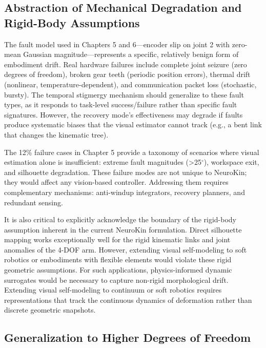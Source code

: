 \documentclass[12pt,a4paper,oneside]{report}
\begin{document}
\subsection{Abstraction of Mechanical Degradation and Rigid-Body Assumptions}

The fault model used in Chapters 5 and 6---encoder slip on joint 2 with zero-mean Gaussian magnitude---represents a specific, relatively benign form of embodiment drift. Real hardware failures include complete joint seizure (zero degrees of freedom), broken gear teeth (periodic position errors), thermal drift (nonlinear, temperature-dependent), and communication packet loss (stochastic, bursty). The temporal stigmergy mechanism should generalize to these fault types, as it responds to task-level success/failure rather than specific fault signatures. However, the recovery mode's effectiveness may degrade if faults produce systematic biases that the visual estimator cannot track (e.g., a bent link that changes the kinematic tree).

The 12\% failure cases in Chapter 5 provide a taxonomy of scenarios where visual estimation alone is insufficient: extreme fault magnitudes (>25$^\circ$), workspace exit, and silhouette degradation. These failure modes are not unique to NeuroKin; they would affect any vision-based controller. Addressing them requires complementary mechanisms: anti-windup integrators, recovery planners, and redundant sensing.

It is also critical to explicitly acknowledge the boundary of the rigid-body assumption inherent in the current NeuroKin formulation. Direct silhouette mapping works exceptionally well for the rigid kinematic links and joint anomalies of the 4-DOF arm. However, extending visual self-modeling to soft robotics or embodiments with flexible elements would violate these rigid geometric assumptions. For such applications, physics-informed dynamic surrogates would be necessary to capture non-rigid morphological drift. Extending visual self-modeling to continuum or soft robotics requires representations that track the continuous dynamics of deformation rather than discrete geometric snapshots.

\subsection{Generalization to Higher Degrees of Freedom}
\end{document}
